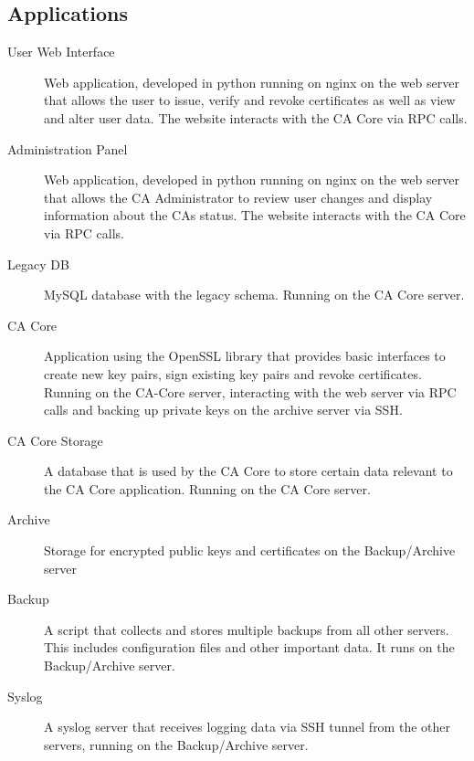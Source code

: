 \documentclass[a4paper, toc=index, 12pt, DIV14, twoside, BCOR2cm, headsepline, numbers=noenddot, bibliography=totoc]{scrbook}
\begin{document}
\subsection{Applications}

\begin{description}
\item[User Web Interface ] Web application, developed in python running on nginx on the web server that allows the user to issue, verify and revoke certificates as well as view and alter user data. The website interacts with the CA Core via RPC calls.

\item[Administration Panel ] Web application, developed in python running on nginx on the web server that allows the CA Administrator to review user changes and display information about the CAs status. The website interacts with the CA Core via RPC calls.

\item[Legacy DB ] MySQL database with the legacy schema. Running on the CA Core server.

\item[CA Core ] Application using the OpenSSL library that provides basic interfaces to create new key pairs, sign existing key pairs and revoke certificates. Running on the CA-Core server,  interacting with the web server via RPC calls and backing up private keys on the archive server via SSH.

\item[CA Core Storage ] A database that is used by the CA Core to store certain data relevant to the CA Core application. Running on the CA Core server.

\item[Archive] Storage for encrypted public keys and certificates on the Backup/Archive server

\item[Backup ] A script that collects and stores multiple backups from all other servers. This includes configuration files and other important data. It runs on the Backup/Archive server.

\item[Syslog ] A syslog server that receives logging data via SSH tunnel from the other servers, running on the Backup/Archive server.
\end{description}
\end{document}
